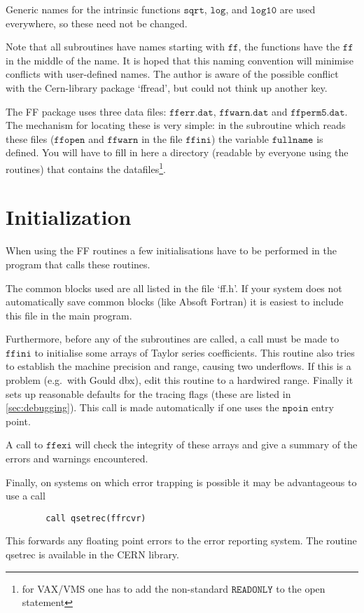 \documentclass[twoside,12pt]{report}
\def\Code#1{\ensuremath{\texttt{#1}}}
\begin{document}
\begin{appendix}
Generic names for the intrinsic functions \Code{sqrt}, \Code{log}, and 
\Code{log10} are used everywhere, so these need not be changed.

Note that all subroutines have names starting with \Code{ff}, the 
functions have the \Code{ff} in the middle of the name.  It is hoped 
that this naming convention will minimise conflicts with user-defined 
names.  The author is aware of the possible conflict with the 
Cern-library package `ffread', but could not think up another key.

The FF package uses three data files: \Code{fferr.dat}, 
\Code{ffwarn.dat} and \Code{ffperm5.dat}.  The mechanism for locating 
these is very simple: in the subroutine which reads these files 
(\Code{ffopen} and \Code{ffwarn} in the file \Code{ffini}) the variable 
\Code{fullname} is defined.  You will have to fill in here a directory 
(readable by everyone using the routines) that contains the 
datafiles\footnote{for VAX/VMS one has to add the non-standard 
\Code{READONLY} to the open statement}.


\section{Initialization}
\label{sc:initialization}

When using the FF routines a few initialisations have to be performed in 
the program that calls these routines.

The common blocks used are all listed in the file `ff.h'.  If your 
system does not automatically save common blocks (like Absoft Fortran) 
it is easiest to include this file in the main program.

Furthermore, before any of the subroutines are called, a call must be 
made to \Code{ffini} to initialise some arrays of Taylor series 
coefficients.  This routine also tries to establish the machine 
precision and range, causing two underflows.  If this is a problem 
(e.g.~with Gould dbx), edit this routine to a hardwired range.  Finally 
it sets up reasonable defaults for the tracing flags (these are listed 
in \ref{sec:debugging}).  This call is made automatically if one uses 
the \Code{npoin} entry point.

A call to \Code{ffexi} will check the integrity of these arrays and 
give a summary of the errors and warnings encountered.

Finally, on systems on which error trapping is possible it may be 
advantageous to use a call
\begin{verbatim}
        call qsetrec(ffrcvr)
\end{verbatim}
This forwards any floating point errors to the error reporting system.  
The routine qsetrec is available in the CERN library.



\end{appendix}
\end{document}
